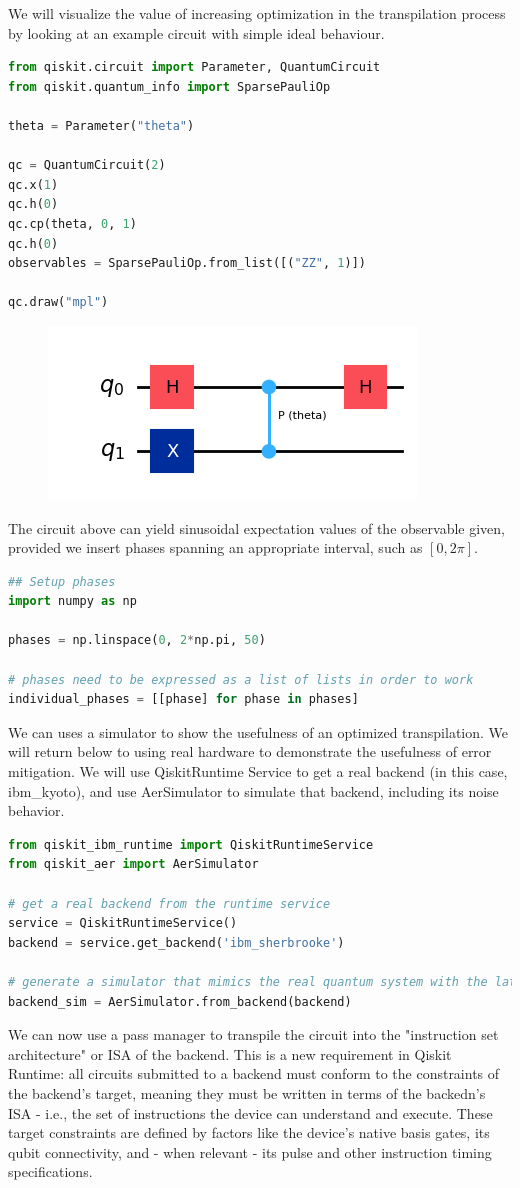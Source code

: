 \documentclass[12pt, oneside]{book}
\theoremstyle{definition}
\theoremstyle{definition}
\theoremstyle{remark}
\begin{document}
We will visualize the value of increasing optimization in the transpilation process by looking at an example circuit with simple ideal behaviour.
\begin{lstlisting}[language=Python]
from qiskit.circuit import Parameter, QuantumCircuit
from qiskit.quantum_info import SparsePauliOp

theta = Parameter("theta")

qc = QuantumCircuit(2)
qc.x(1)
qc.h(0)
qc.cp(theta, 0, 1)
qc.h(0)
observables = SparsePauliOp.from_list([("ZZ", 1)])

qc.draw("mpl")
\end{lstlisting}
\begin{figure}[H]
    \centering
    \includegraphics[width=0.5\linewidth]{../images/err_sup_circ.png}
\end{figure}
The circuit above can yield sinusoidal expectation values of the observable given, provided we insert phases spanning an appropriate interval, such as $[0,2\pi]$.
\begin{lstlisting}[language=Python]
## Setup phases
import numpy as np

phases = np.linspace(0, 2*np.pi, 50)

# phases need to be expressed as a list of lists in order to work
individual_phases = [[phase] for phase in phases]
\end{lstlisting}

We can uses a simulator to show the usefulness of an optimized transpilation. We will return below to using real hardware to demonstrate the usefulness of error mitigation. We will use QiskitRuntime Service to get a real backend (in this case, ibm\_kyoto), and use AerSimulator to simulate that backend, including its noise behavior.
\begin{lstlisting}[language=Python]
from qiskit_ibm_runtime import QiskitRuntimeService
from qiskit_aer import AerSimulator

# get a real backend from the runtime service
service = QiskitRuntimeService()
backend = service.get_backend('ibm_sherbrooke')
 
# generate a simulator that mimics the real quantum system with the latest calibration results
backend_sim = AerSimulator.from_backend(backend)
\end{lstlisting}
We can now use a pass manager to transpile the circuit into the "instruction set architecture" or ISA of the backend. This is a new requirement in Qiskit Runtime: all circuits submitted to a backend must conform to the constraints of the backend's target, meaning they must be written in terms of the backedn's ISA - i.e., the set of instructions the device can understand and execute. These target constraints are defined by factors like the device's native basis gates, its qubit connectivity, and - when relevant - its pulse and other instruction timing specifications.
\end{document}
